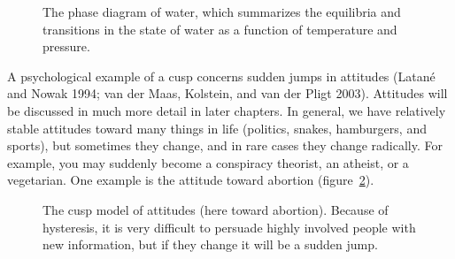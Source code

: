 \documentclass[
  a4paper,
  DIV=11,
  numbers=noendperiod,
  oneside]{scrreprt}
\begin{document}
\begin{figure}


\caption{\label{fig-ch3-img12-old-24}The phase diagram of water, which
summarizes the equilibria and transitions in the state of water as a
function of temperature and pressure.}

\end{figure}%

A psychological example of a cusp concerns sudden jumps in attitudes
(Latané and Nowak 1994; van der Maas, Kolstein, and van der Pligt 2003).
Attitudes will be discussed in much more detail in later chapters. In
general, we have relatively stable attitudes toward many things in life
(politics, snakes, hamburgers, and sports), but sometimes they change,
and in rare cases they change radically. For example, you may suddenly
become a conspiracy theorist, an atheist, or a vegetarian. One example
is the attitude toward abortion (figure~\ref{fig-ch3-img13-old-25}).

\begin{figure}


\caption{\label{fig-ch3-img13-old-25}The cusp model of attitudes (here
toward abortion). Because of hysteresis, it is very difficult to
persuade highly involved people with new information, but if they change
it will be a sudden jump.}

\end{figure}%
\end{document}
